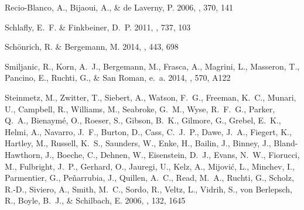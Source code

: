 \documentclass[12pt, preprint]{aastex}
\begin{document}
\begin{thebibliography}{24}
{Recio-Blanco}, A., {Bijaoui}, A., \& {de Laverny}, P. 2006, \mnras, 370, 141

{Schlafly}, E.~F. \& {Finkbeiner}, D.~P. 2011, \apj, 737, 103

{Sch{\"o}nrich}, R. \& {Bergemann}, M. 2014, \mnras, 443, 698

{Smiljanic}, R., {Korn}, A.~J., {Bergemann}, M., {Frasca}, A., {Magrini}, L.,
  {Masseron}, T., {Pancino}, E., {Ruchti}, G., \& {San Roman}, e.~a. 2014,
  \aap, 570, A122


{Steinmetz}, M., {Zwitter}, T., {Siebert}, A., {Watson}, F.~G., {Freeman},
  K.~C., {Munari}, U., {Campbell}, R., {Williams}, M., {Seabroke}, G.~M.,
  {Wyse}, R.~F.~G., {Parker}, Q.~A., {Bienaym{\'e}}, O., {Roeser}, S.,
  {Gibson}, B.~K., {Gilmore}, G., {Grebel}, E.~K., {Helmi}, A., {Navarro},
  J.~F., {Burton}, D., {Cass}, C.~J.~P., {Dawe}, J.~A., {Fiegert}, K.,
  {Hartley}, M., {Russell}, K.~S., {Saunders}, W., {Enke}, H., {Bailin}, J.,
  {Binney}, J., {Bland-Hawthorn}, J., {Boeche}, C., {Dehnen}, W., {Eisenstein},
  D.~J., {Evans}, N.~W., {Fiorucci}, M., {Fulbright}, J.~P., {Gerhard}, O.,
  {Jauregi}, U., {Kelz}, A., {Mijovi{\'c}}, L., {Minchev}, I., {Parmentier},
  G., {Pe{\~n}arrubia}, J., {Quillen}, A.~C., {Read}, M.~A., {Ruchti}, G.,
  {Scholz}, R.-D., {Siviero}, A., {Smith}, M.~C., {Sordo}, R., {Veltz}, L.,
  {Vidrih}, S., {von Berlepsch}, R., {Boyle}, B.~J., \& {Schilbach}, E. 2006,
  \aj, 132, 1645


\end{thebibliography}
\end{document}
